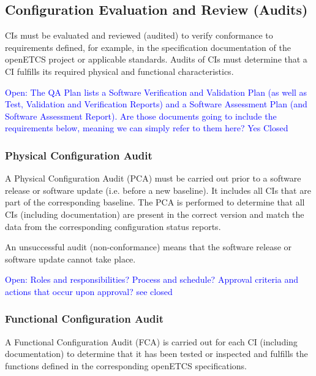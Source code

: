 \documentclass{template/openetcs_report}
\begin{document}
\subsection{Configuration Evaluation and Review (Audits)} %
\label{sec:Configuration Evaluation and Review (Audits)}

CIs must be evaluated and reviewed (audited) to verify conformance to requirements defined, for example, in the specification documentation of the openETCS project or applicable standards. Audits of CIs must determine that a CI fulfills its required physical and functional characteristics.

\textcolor{blue}{Open: The QA Plan lists a Software Verification and Validation Plan (as well as Test, Validation and Verification Reports) and a Software Assessment Plan (and Software Assessment Report). Are those documents going to include the requirements below, meaning we can simply refer to them here? Yes Closed}


\subsubsection{Physical Configuration Audit} %
\label{sec:Physical Configuration Audit}

A Physical Configuration Audit (PCA) must be carried out prior to a software release or software update (i.e. before a new baseline). It includes all CIs that are part of the corresponding baseline. The PCA is performed to determine that all CIs (including documentation) are present in the correct version and match the data from the corresponding configuration status reports.

An unsuccessful audit (non-conformance) means that the software release or software update cannot take place.

\textcolor{blue}{Open: Roles and responsibilities? Process and schedule? Approval criteria and actions that occur upon approval? see \cite{ADD} closed}


\subsubsection{Functional Configuration Audit} %
\label{sec:Functional Configuration Audit}

A Functional Configuration Audit (FCA) is carried out for each CI (including documentation) to determine that it has been tested or inspected and fulfills the functions defined in the corresponding openETCS specifications.
\end{document}

